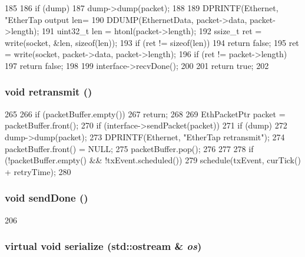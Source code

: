 \begin{DoxyCode}
185 {
186     if (dump)
187         dump->dump(packet);
188 
189     DPRINTF(Ethernet, "EtherTap output len=%
190     DDUMP(EthernetData, packet->data, packet->length);
191     uint32_t len = htonl(packet->length);
192     ssize_t ret = write(socket, &len, sizeof(len));
193     if (ret != sizeof(len))
194         return false;
195     ret = write(socket, packet->data, packet->length);
196     if (ret != packet->length)
197         return false;
198 
199     interface->recvDone();
200 
201     return true;
202 }
\end{DoxyCode}
\hypertarget{classEtherTap_a27657409da52b498bd5607ef71586b44}{
\subsubsection[{retransmit}]{\setlength{\rightskip}{0pt plus 5cm}void retransmit ()}}
\label{classEtherTap_a27657409da52b498bd5607ef71586b44}



\begin{DoxyCode}
265 {
266     if (packetBuffer.empty())
267         return;
268 
269     EthPacketPtr packet = packetBuffer.front();
270     if (interface->sendPacket(packet)) {
271         if (dump)
272             dump->dump(packet);
273         DPRINTF(Ethernet, "EtherTap retransmit\n");
274         packetBuffer.front() = NULL;
275         packetBuffer.pop();
276     }
277 
278     if (!packetBuffer.empty() && !txEvent.scheduled())
279         schedule(txEvent, curTick() + retryTime);
280 }
\end{DoxyCode}
\hypertarget{classEtherTap_aa1f5a3f61e2513049769a9ca8b16ea2d}{
\subsubsection[{sendDone}]{\setlength{\rightskip}{0pt plus 5cm}void sendDone ()}}
\label{classEtherTap_aa1f5a3f61e2513049769a9ca8b16ea2d}



\begin{DoxyCode}
206 {}
\end{DoxyCode}
\hypertarget{classEtherTap_ad6272f80ae37e8331e3969b3f072a801}{
\subsubsection[{serialize}]{\setlength{\rightskip}{0pt plus 5cm}virtual void serialize (std::ostream \& {\em os})}}
\label{classEtherTap_ad6272f80ae37e8331e3969b3f072a801}


